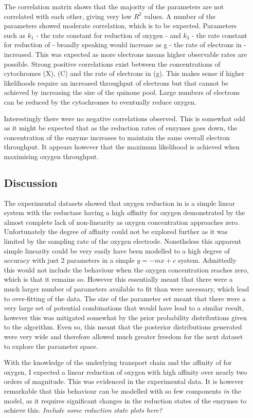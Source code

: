\afterpage{\clearpage}
The correlation matrix shows that the majority of the parameters are not correlated with each other, giving very low $R^2$ values. A number of the parameters showed moderate correlation, which is to be expected. Parameters such as $k_1$ - the rate constant for reduction of oxygen - and $k_3$ - the rate constant for reduction of \cbbthree{} -  broadly speaking would increase as g - the rate of electrons in -  increased. This was expected as more electrons means higher observable rates are possible. Strong positive correlations exist between the concentrations of cytochromes (X), \cbbthree{}(C) and the rate of electrons in (g). This makes sense if higher likelihoods require an increased throughput of electrons but that cannot be achieved by increasing the size of the quinone pool. Large numbers of electrons can be reduced by the cytochromes to eventually reduce oxygen.

Interestingly there were no negative correlations observed. This is somewhat odd as it might be expected that as the reduction rates of enzymes goes down, the concentration of the enzyme increases to maintain the same overall electron throughput. It appears however that the maximum likelihood is achieved when maximising oxygen throughput.
\subsection{Discussion}
The experimental datasets showed that oxygen reduction in \Nm{} is a simple linear system with the reductase having a high affinity for oxygen demonstrated by the almost complete lack of non-linearity as oxygen concentration approaches zero. Unfortunately the degree of affinity could not be explored further as it was limited by the sampling rate of the oxygen electrode. Nonetheless this apparent simple linearity could be very easily have been modelled to a high degree of accuracy with just 2 parameters in a simple $y=-mx+c$ system. Admittedly this would not include the behaviour when the oxygen concentration reaches zero, which is that it remains so. However this essentially meant that there were a much larger number of parameters available to fit than were necessary, which lead to over-fitting of the data. The size of the parameter set meant that there were a very large set of potential combinations that would have lead to a similar result, however this was mitigated somewhat by the prior probability distributions given to the algorithm. Even so, this meant that the posterior distributions generated were very wide and therefore allowed much greater freedom for the next dataset to explore the parameter space.

With the knowledge of the underlying transport chain and the affinity of \cbbthree{} for oxygen, I expected a linear reduction of oxygen with high affinity over nearly two orders of magnitude. This was evidenced in the experimental data. It is however remarkable that this behaviour can be modelled with so few components \textit{in} the model, as it requires significant changes in the reduction states of the enzymes to achieve this. \textit{Include some reduction state plots here?}
